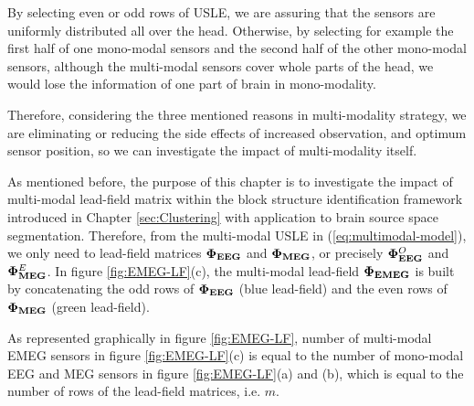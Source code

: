 By selecting even or odd rows of USLE, we are assuring that the sensors are uniformly distributed all over the head.
Otherwise, by selecting for example the first half of one mono-modal sensors and the second half of the other mono-modal sensors, although the multi-modal sensors cover whole parts of the head, we would lose the information of one part of brain in mono-modality.

Therefore, considering the three mentioned reasons in multi-modality strategy, we are eliminating or reducing the side effects of increased observation, and optimum sensor position, so we can investigate the impact of multi-modality itself.

As mentioned before, the purpose of this chapter is to investigate the impact of multi-modal lead-field matrix within the block structure identification framework introduced in Chapter \ref{sec:Clustering} with application to brain source space segmentation.
Therefore, from the multi-modal USLE in (\ref{eq:multimodal-model}), we only need to lead-field matrices $\boldsymbol{\Phi}_{\boldsymbol{\mathrm{EEG}}}$ and $\boldsymbol{\Phi}_{\boldsymbol{\mathrm{MEG}}}$, or precisely $\boldsymbol{\Phi}_{\boldsymbol{\mathrm{EEG}}}^O$ and $\boldsymbol{\Phi}_{\boldsymbol{\mathrm{MEG}}}^E$.
In figure \ref{fig:EMEG-LF}(c), the multi-modal lead-field $\boldsymbol{\Phi}_{\boldsymbol{\mathrm{EMEG}}}$ is built by concatenating the odd rows of $\boldsymbol{\Phi}_{\boldsymbol{\mathrm{EEG}}}$ (blue lead-field) and the even rows of $\boldsymbol{\Phi}_{\boldsymbol{\mathrm{MEG}}}$ (green lead-field).

As represented graphically in figure \ref{fig:EMEG-LF}, number of multi-modal EMEG sensors in figure \ref{fig:EMEG-LF}(c) is equal to the number of mono-modal EEG and MEG sensors in figure \ref{fig:EMEG-LF}(a) and (b), which is equal to the number of rows of the lead-field matrices, i.e. $m$.

